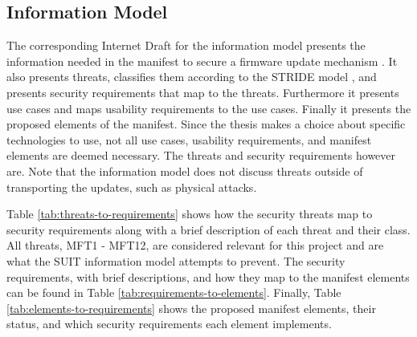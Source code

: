 \documentclass[0-thesis.tex]{subfiles}
\begin{document}

\subsection{Information Model}
\label{ssec:information-model}
The corresponding Internet Draft for the information model presents the information needed
in the manifest to secure a firmware update mechanism \parencite{suit-information-model}.
It also presents threats, classifies them according to the STRIDE model
\parencite{stride}, and presents security requirements that map to the threats.
Furthermore it presents use cases and maps usability requirements to the use cases.
Finally it presents the proposed elements of the manifest. Since the thesis makes a choice
about specific technologies to use, not all use cases, usability requirements, and
manifest elements are deemed necessary. The threats and security requirements however are.
Note that the information model does not discuss threats outside of transporting the
updates, such as physical attacks.

Table \ref{tab:threats-to-requirements} shows how the security threats map to security
requirements along with a brief description of each threat and their class. All threats,
MFT1 - MFT12, are considered relevant for this project and are what the SUIT information
model attempts to prevent. The security requirements, with brief descriptions, and how
they map to the manifest elements can be found in Table
\ref{tab:requirements-to-elements}. Finally, Table \ref{tab:elements-to-requirements}
shows the proposed manifest elements, their status, and which security requirements each
element implements.
\end{document}
